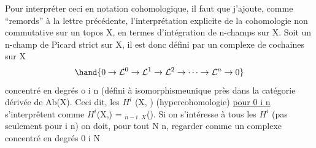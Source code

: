 Pour interpréter ceci en notation cohomologique, il faut que j'ajoute,
comme ``remords'' à la lettre précédente, l'interprétation explicite de la
cohomologie non commutative sur un topos X, en termes d'intégration de
n-champs sur X. Soit  un n-champ de Picard strict sur X, il est donc
défini par un complexe de cochaines  sur X
\[
\hand{0 \to \mathcal{L}^0 \to \mathcal{L}^1 \to \mathcal{L}^2 \to \dots \to \mathcal{L}^n \to 0}
\]
concentré en degrés o \hand{$\leq$} i \hand{$\leq$} n (défini à isomorphisme\hand{/}unique près dans la
catégorie dérivée de Ab(X)\hand{)}. Ceci dit, les $H^i$ (X,  ) (hypercohomologie)
\uline{pour 0 \hand{$\leq$} i \hand{$\leq$} n} s'interprêtent comme $H^i$(X,) = \hand{$\pi$}$_{n-i}$ \hand{$\Gamma$}$_X$().
Si on s'intéresse à tous les $H^i$ (pas seulement pour i \hand{$\leq$} n) on doit, pour
tout N \hand{$\geq$} n, regarder  comme un complexe concentré en degrés 0 \hand{$\leq$} i \hand{$\leq$} N

